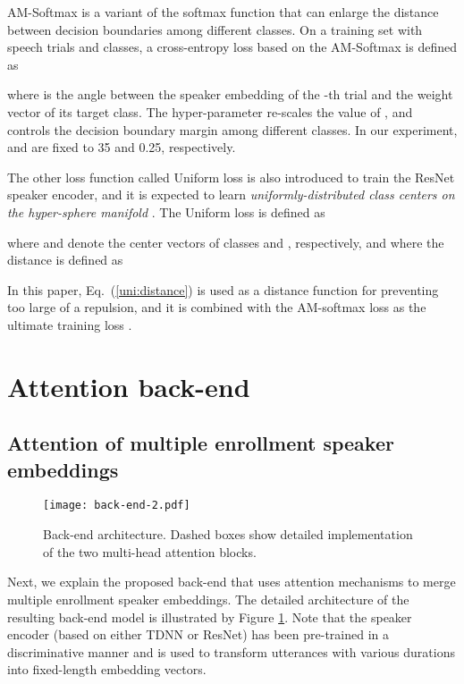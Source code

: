 \documentclass[a4paper]{article}
\begin{document}
AM-Softmax is a variant of the softmax function that can enlarge the distance between decision boundaries among different classes. On a training set with  speech trials and  classes, a cross-entropy loss based on the AM-Softmax is defined as 

where  is the angle between the speaker embedding of the -th trial and the weight vector of its target class. The hyper-parameter  re-scales the value of , and  controls the decision boundary margin among different classes. 
In our experiment,  and  are fixed to 35 and 0.25, respectively.




The other loss function called Uniform loss \cite{Duan2019-Uniform} is also introduced to train the ResNet speaker encoder, and it is expected to learn \textit{uniformly-distributed class centers on the hyper-sphere manifold} \cite{Duan2019-Uniform}.
The Uniform loss is defined as

where  and  denote the center vectors of classes  and , respectively, and where the distance  is defined as

In this paper, Eq.~(\ref{uni:distance}) is used as a distance function for preventing too large of a repulsion, and it is combined with the AM-softmax loss as the ultimate training loss .


\section{Attention back-end}
\subsection{Attention of multiple enrollment speaker embeddings}

\begin{figure}[t]
  \centering
  \texttt{[image: back-end-2.pdf]}
  \caption{Back-end architecture. Dashed boxes show detailed implementation of the two multi-head attention blocks.}
  \label{fig:back-end}
  \vspace{-5mm}
\end{figure}





Next, we explain the proposed back-end that uses attention mechanisms to merge multiple enrollment speaker embeddings. The detailed architecture of the resulting back-end model is illustrated by Figure \ref{fig:back-end}. 
Note that the speaker encoder (based on either TDNN or ResNet) has been pre-trained in a discriminative manner and is used to transform utterances with various durations into fixed-length embedding vectors.
\end{document}
